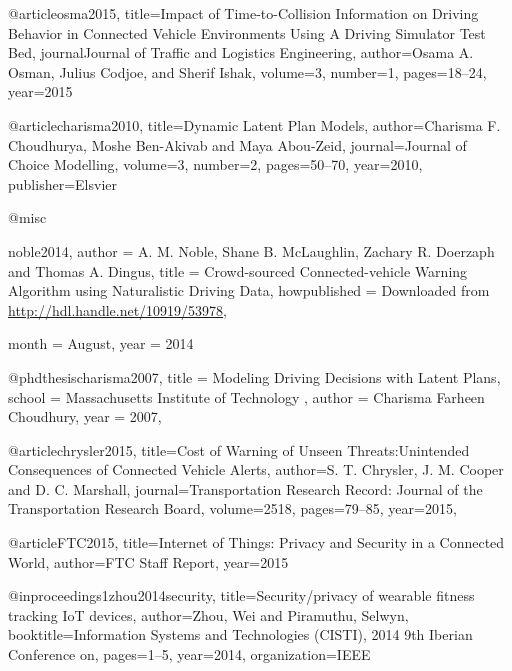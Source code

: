 {{%








@article{osma2015,
	title={Impact of Time-to-Collision Information on Driving Behavior in Connected Vehicle Environments Using A Driving Simulator Test Bed},
	journal{Journal of Traffic and Logistics Engineering},
	author={Osama A. Osman, Julius Codjoe, and Sherif Ishak},
	volume={3},
	number={1},
	pages={18--24},
	year={2015}
}


@article{charisma2010,
	title={Dynamic Latent Plan Models},
	author={Charisma F. Choudhurya, Moshe Ben-Akivab and Maya Abou-Zeid},
	journal={Journal of Choice Modelling},
	volume={3},
	number={2},
	pages={50--70},
	year={2010},
	publisher={Elsvier}
}


@misc{noble2014,
	author = {A. M. Noble, Shane B. McLaughlin, Zachary R. Doerzaph and Thomas A. Dingus},
	title = {Crowd-sourced Connected-vehicle Warning Algorithm using Naturalistic Driving Data},
	howpublished = {Downloaded from \url{http://hdl.handle.net/10919/53978}},
	
	month = August,
	year = 2014
}


@phdthesis{charisma2007,
	title    = {Modeling Driving Decisions with Latent Plans},
	school   = {Massachusetts Institute of Technology },
	author   = {Charisma Farheen Choudhury},
	year     = {2007}, %
}


@article{chrysler2015,
	title={Cost of Warning of Unseen Threats:Unintended Consequences of Connected Vehicle Alerts},
	author={S. T. Chrysler, J. M. Cooper and D. C. Marshall},
	journal={Transportation Research Record: Journal of the Transportation Research Board},
	volume={2518},
	pages={79--85},
	year={2015},
}





@article{FTC2015,
	title={Internet of Things: Privacy and Security in a Connected World},
	author={FTC Staff Report},
	year={2015}
}



@inproceedings{1zhou2014security,
	title={Security/privacy of wearable fitness tracking {I}o{T} devices},
	author={Zhou, Wei and Piramuthu, Selwyn},
	booktitle={Information Systems and Technologies (CISTI), 2014 9th Iberian Conference on},
	pages={1--5},
	year={2014},
	organization={IEEE}
}


}}
